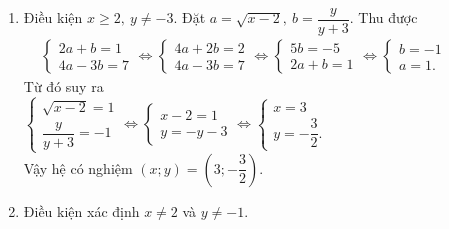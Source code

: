 \begin{bt}
{\begin{enumerate}
			Đặt $\heva{&a=\sqrt{x}\\&b=\sqrt{y-1}}$. Điều kiện $a;b\ge 0$. Khi đó hệ phương trình ban đầu trở thành
			
			$\heva{&a+2b=5\\&4a-b=2} \Leftrightarrow \heva{&a=5-2b\\&4(5-2b)-b=2} \Leftrightarrow \heva{&a=5-2b\\&-9b=-18} 
			\Leftrightarrow
			\heva{&a=1\\&b=2.}$\\
			Do đó $\heva{&\sqrt{x}=1\\&\sqrt{y-1}=2} \Leftrightarrow \heva{&x=1\\&y-1=4} \Leftrightarrow \heva{&x=1\\&y=5.}$\\
			Vậy hệ phương trình có nghiệm  $(x;y)=(1;5).$
			\item Điều kiện $x\geq 2,\ y\neq -3$. Đặt $a=\sqrt{x-2},\ b=\dfrac{y}{y+3}$. Thu được\\
			$\begin{aligned}
			& \begin{cases}2a+b=1\\ 4a-3b=7\end{cases}\Leftrightarrow \begin{cases}4a+2b=2\\ 4a-3b=7\end{cases}\Leftrightarrow \begin{cases}5b=-5\\ 2a+b=1\end{cases}\Leftrightarrow \begin{cases}b=-1\\ a=1.\end{cases}
			\end{aligned}$\\
			Từ đó suy ra\\
			$\begin{cases}\sqrt{x-2}=1\\ \dfrac{y}{y+3}=-1\end{cases}\Leftrightarrow \begin{cases}x-2=1\\ y=-y-3\end{cases}\Leftrightarrow \begin{cases}x=3\\ y=-\dfrac{3}{2}.\end{cases}$\\
			Vậy hệ có nghiệm $(x;y)=\left(3;-\dfrac{3}{2}\right)$.
			\item Điều kiện xác định $x \neq 2$ và $y \neq -1$.\\

\end{enumerate}}
\end{bt}
